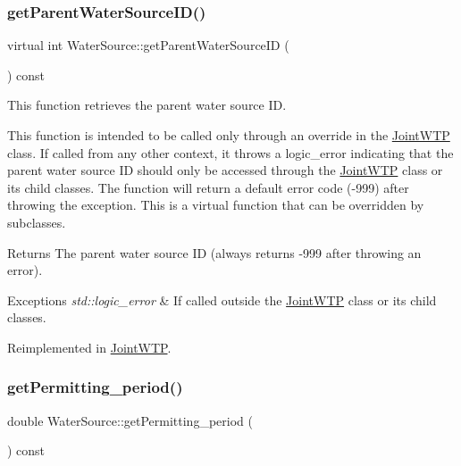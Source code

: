 \subsubsection{\texorpdfstring{get\+Parent\+Water\+Source\+I\+D()}{getParentWaterSourceID()}}
{\footnotesize\ttfamily virtual int Water\+Source\+::get\+Parent\+Water\+Source\+ID (\begin{DoxyParamCaption}{ }\end{DoxyParamCaption}) const\hspace{0.3cm}{\ttfamily [virtual]}}



This function retrieves the parent water source ID. 

This function is intended to be called only through an override in the {\ttfamily \mbox{\hyperlink{classJointWTP}{Joint\+W\+TP}}} class. If called from any other context, it throws a {\ttfamily logic\+\_\+error} indicating that the parent water source ID should only be accessed through the {\ttfamily \mbox{\hyperlink{classJointWTP}{Joint\+W\+TP}}} class or its child classes. The function will return a default error code ({\ttfamily -\/999}) after throwing the exception. This is a virtual function that can be overridden by subclasses.

\begin{DoxyReturn}{Returns}
The parent water source ID (always returns {\ttfamily -\/999} after throwing an error).
\end{DoxyReturn}

\begin{DoxyExceptions}{Exceptions}
{\em std\+::logic\+\_\+error} & If called outside the {\ttfamily \mbox{\hyperlink{classJointWTP}{Joint\+W\+TP}}} class or its child classes. \\
\hline
\end{DoxyExceptions}


Reimplemented in \mbox{\hyperlink{classJointWTP_ae4805e616725c109f23c0513d6ef2711}{Joint\+W\+TP}}.

\mbox{\label{classWaterSource_aa21d3f1c87ced40c2b673d9e43d99176}} 
\subsubsection{\texorpdfstring{get\+Permitting\+\_\+period()}{getPermitting\_period()}}
{\footnotesize\ttfamily double Water\+Source\+::get\+Permitting\+\_\+period (\begin{DoxyParamCaption}{ }\end{DoxyParamCaption}) const}



